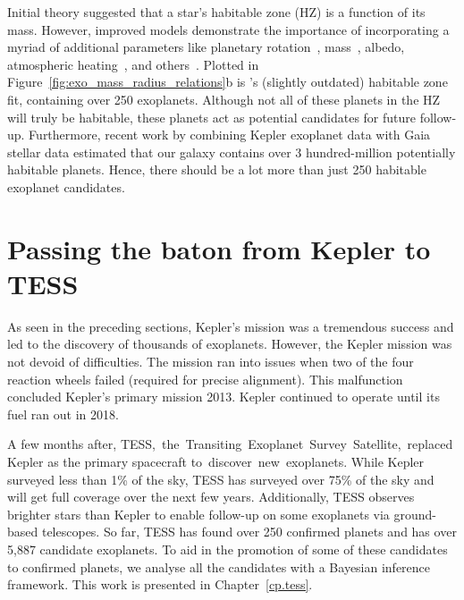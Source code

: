 Initial theory suggested that a star's habitable zone (HZ) is a function of its mass. 
However, improved models demonstrate the importance of incorporating a myriad of additional parameters like planetary rotation~\cite{Yang:2014:ApJL},  mass~\cite{Kopparapu:2014:ApJL}, albedo, atmospheric heating~\cite{Kasting:2011:AsBio}, and others~\cite{Kopparapu:2013:ApJ, Kopparapu:2014:ApJL, Shields:2014:ApJL}. 
Plotted in Figure~\ref{fig:exo_mass_radius_relations}b is \citet{Kopparapu:2014:ApJL}'s (slightly outdated) habitable zone fit, containing over 250 exoplanets.
Although not all of these planets in the HZ will truly be habitable, these planets act as potential candidates for future follow-up. 
Furthermore, recent work by 
\citet{Bryson:2021:AJ} combining Kepler exoplanet data with Gaia stellar data estimated that our galaxy contains over 3 hundred-million potentially habitable planets.
Hence, there should be a lot more than just 250 habitable exoplanet candidates.


\section{Passing the baton from Kepler to TESS }
As seen in the preceding sections, Kepler's mission was a tremendous success and led to the discovery of thousands of exoplanets.
However, the Kepler mission was not devoid of difficulties.
The mission ran into issues when two of the four reaction wheels failed (required for precise alignment). 
This malfunction concluded Kepler's primary mission 2013.
Kepler continued to operate until its fuel ran out in 2018.

A few months after, TESS, the Transiting Exoplanet Survey Satellite, replaced Kepler as the primary spacecraft to discover new exoplanets.
While Kepler surveyed less than 1\% of the sky, TESS has surveyed over 75\% of the sky and will get full coverage over the next few years. 
Additionally, TESS observes brighter stars than Kepler to enable follow-up on some exoplanets via ground-based telescopes.  
So far, TESS has found over 250 confirmed planets and has over 5,887 candidate exoplanets. 
To aid in the promotion of some of these candidates to confirmed planets, we analyse all the candidates with a Bayesian inference framework. 
This work is presented in Chapter~\ref{cp.tess}.


